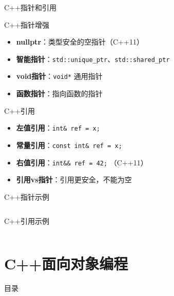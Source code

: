 \documentclass[UTF8,aspectratio=169]{beamer}
\begin{document}
\begin{frame}{C++指针和引用}
    \begin{ytublock}{C++指针增强}
        \begin{itemize}
            \item \textbf{nullptr}：类型安全的空指针（C++11）
            \item \textbf{智能指针}：\texttt{std::unique\_ptr}、\texttt{std::shared\_ptr}
            \item \textbf{void指针}：\texttt{void*} 通用指针
            \item \textbf{函数指针}：指向函数的指针
        \end{itemize}
    \end{ytublock}

    \begin{ytublock}{C++引用}
        \begin{itemize}
            \item \textbf{左值引用}：\texttt{int\& ref = x;}
            \item \textbf{常量引用}：\texttt{const int\& ref = x;}
            \item \textbf{右值引用}：\texttt{int\&\& ref = 42;} （C++11）
            \item \textbf{引用vs指针}：引用更安全，不能为空
        \end{itemize}
    \end{ytublock}
\end{frame}

\begin{frame}[fragile]{C++指针示例}
    \inputminted[firstline=1,lastline=18]{cpp}{code/cpp_pointer_example.cpp}
\end{frame}

\begin{frame}[fragile]{C++引用示例}
    \inputminted[firstline=1,lastline=15]{cpp}{code/cpp_reference_example.cpp}
\end{frame}

\section{C++面向对象编程}
\begin{frame}{目录}
    \begin{multicols}{2}
        \tableofcontents[currentsection]
    \end{multicols}
\end{frame}
\end{document}
